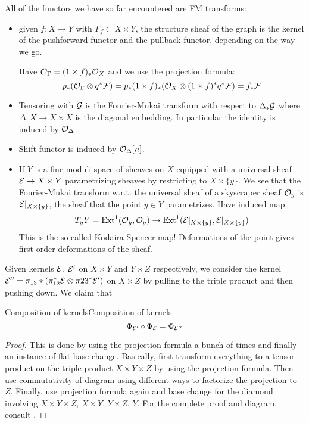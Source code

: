 All of the functors we have so far encountered are FM transforms:
\begin{itemize}
    \item given $f:X\to Y$ with $\Gamma_f\subset X\times Y$, the structure sheaf of the graph is the kernel of the pushforward functor and the pullback functor, depending on the way we go.

    Have $\mathcal{O}_\Gamma=(1\times f)_*\mathcal{O}_X$ and we use the projection formula:
    \begin{equation*}
        p_*(\mathcal{O}_\Gamma\otimes q^*\mathcal{F})
            = p_*(1\times f)_*(\mathcal{O}_X\otimes(1\times f)^*q^*\mathcal{F})
            = f_*\mathcal{F}
    \end{equation*}

    \item Tensoring with $\mathcal{G}$ is the Fourier-Mukai transform with respect to $\Delta_*\mathcal{G}$ where $\Delta:X\to X\times X$ is the diagonal embedding. In particular the identity is induced by $\mathcal{O}_\Delta$.

    \item Shift functor is induced by $\mathcal{O}_\Delta[n]$.

    \item If $Y$ is a fine moduli space of sheaves on $X$ equipped with a universal sheaf $\mathcal{E}\to X\times Y$ parametrizing sheaves by restricting to $X\times\{y\}$. We see that the Fourier-Mukai transform w.r.t. the universal sheaf of a skyscraper sheaf $\mathcal{O}_y$ is $\mathcal{E}|_{X\times\{y\}}$, the sheaf that the point $y\in Y$ parametrizes. Have induced map
        \begin{equation*}
            T_yY
                = \operatorname{Ext}^1(\mathcal{O}_{y},\mathcal{O}_{y})
                \to \operatorname{Ext}^1(\mathcal{E}|_{X\times\{y\}},\mathcal{E}|_{X\times\{y\}})
        \end{equation*}
        This is the so-called Kodaira-Spencer map! Deformations of the point gives first-order deformations of the sheaf.
\end{itemize}

Given kernels $\mathcal{E}$, $\mathcal{E}'$ on $X\times Y$ and $Y\times Z$ respectively, we consider the kernel $\mathcal{E}''=\pi_{13}*(\pi_{12}^*\mathcal{E}\otimes\pi{23}^*\mathcal{E}')$ on $X\times Z$ by pulling to the triple product and then pushing down. We claim that
\begin{proposition}{Composition of kernels}{Composition of kernels}
\begin{equation*}
    \Phi_{\mathcal{E}'}\circ\Phi_{\mathcal{E}} = \Phi_{\mathcal{E}''}
\end{equation*}
\end{proposition}
\begin{proof}
    This is done by using the projection formula a bunch of times and finally an instance of flat base change. Basically, first transform everything to a tensor product on the triple product $X\times Y \times Z$ by using the projection formula. Then use commutativity of diagram using different ways to factorize the projection to $Z$. Finally, use projection formula again and base change for the diamond involving $X\times Y \times Z$, $X\times Y$, $Y\times Z$, $Y$. For the complete proof and diagram, consult \cite[\S5][Proposition~5.10]{Huybrechts}. 
\end{proof}

